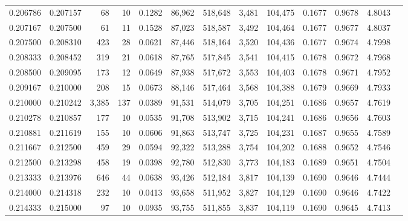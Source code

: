 \begin{tabular}{rrrrrrrrrrrrr}
0.206786 & 0.207157 &    68 &  10 &                                     0.1282 &  86,962 & 518,648 &   3,481 & 104,475 & 0.1677 & 0.9678 & 4.8043 \\
0.207167 & 0.207500 &    61 &  11 &                                     0.1528 &  87,023 & 518,587 &   3,492 & 104,464 & 0.1677 & 0.9677 & 4.8037 \\
0.207500 & 0.208310 &   423 &  28 &                                     0.0621 &  87,446 & 518,164 &   3,520 & 104,436 & 0.1677 & 0.9674 & 4.7998 \\
0.208333 & 0.208452 &   319 &  21 &                                     0.0618 &  87,765 & 517,845 &   3,541 & 104,415 & 0.1678 & 0.9672 & 4.7968 \\
0.208500 & 0.209095 &   173 &  12 &                                     0.0649 &  87,938 & 517,672 &   3,553 & 104,403 & 0.1678 & 0.9671 & 4.7952 \\
0.209167 & 0.210000 &   208 &  15 &                                     0.0673 &  88,146 & 517,464 &   3,568 & 104,388 & 0.1679 & 0.9669 & 4.7933 \\
0.210000 & 0.210242 & 3,385 & 137 &                                     0.0389 &  91,531 & 514,079 &   3,705 & 104,251 & 0.1686 & 0.9657 & 4.7619 \\
0.210278 & 0.210857 &   177 &  10 &                                     0.0535 &  91,708 & 513,902 &   3,715 & 104,241 & 0.1686 & 0.9656 & 4.7603 \\
0.210881 & 0.211619 &   155 &  10 &                                     0.0606 &  91,863 & 513,747 &   3,725 & 104,231 & 0.1687 & 0.9655 & 4.7589 \\
0.211667 & 0.212500 &   459 &  29 &                                     0.0594 &  92,322 & 513,288 &   3,754 & 104,202 & 0.1688 & 0.9652 & 4.7546 \\
0.212500 & 0.213298 &   458 &  19 &                                     0.0398 &  92,780 & 512,830 &   3,773 & 104,183 & 0.1689 & 0.9651 & 4.7504 \\
0.213333 & 0.213976 &   646 &  44 &                                     0.0638 &  93,426 & 512,184 &   3,817 & 104,139 & 0.1690 & 0.9646 & 4.7444 \\
0.214000 & 0.214318 &   232 &  10 &                                     0.0413 &  93,658 & 511,952 &   3,827 & 104,129 & 0.1690 & 0.9646 & 4.7422 \\
0.214333 & 0.215000 &    97 &  10 &                                     0.0935 &  93,755 & 511,855 &   3,837 & 104,119 & 0.1690 & 0.9645 & 4.7413 \\

\end{tabular}
